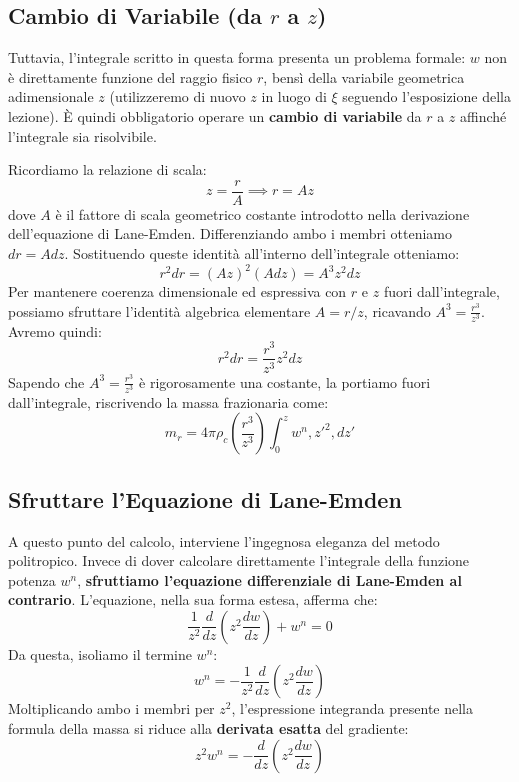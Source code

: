\subsection{Cambio di Variabile (da $r$ a $z$)}

Tuttavia, l'integrale scritto in questa forma presenta un problema formale: $w$ non è direttamente funzione del raggio fisico $r$, bensì della variabile geometrica adimensionale $z$ (utilizzeremo di nuovo $z$ in luogo di $\xi$ seguendo l'esposizione della lezione).
È quindi obbligatorio operare un \textbf{cambio di variabile} da $r$ a $z$ affinché l'integrale sia risolvibile.

Ricordiamo la relazione di scala:
\begin{equation}
z = \frac{r}{A} \implies r = A z
\end{equation}
dove $A$ è il fattore di scala geometrico costante introdotto nella derivazione dell'equazione di Lane-Emden. Differenziando ambo i membri otteniamo $dr = A dz$.
Sostituendo queste identità all'interno dell'integrale otteniamo:
\begin{equation}
r^2 dr = (A z)^2 (A dz) = A^3 z^2 dz
\end{equation}
Per mantenere coerenza dimensionale ed espressiva con $r$ e $z$ fuori dall'integrale, possiamo sfruttare l'identità algebrica elementare $A = r/z$, ricavando $A^3 = \frac{r^3}{z^3}$. Avremo quindi:
\begin{equation}
r^2 dr = \frac{r^3}{z^3} z^2 dz
\end{equation}
Sapendo che $A^3 = \frac{r^3}{z^3}$ è rigorosamente una costante, la portiamo fuori dall'integrale, riscrivendo la massa frazionaria come:
\begin{equation}
m_r = 4\pi \rho_c \left( \frac{r^3}{z^3} \right) \int_0^z w^n , z'^2 , dz'
\end{equation}

\subsection{Sfruttare l'Equazione di Lane-Emden}

A questo punto del calcolo, interviene l'ingegnosa eleganza del metodo politropico. Invece di dover calcolare direttamente l'integrale della funzione potenza $w^n$, \textbf{sfruttiamo l'equazione differenziale di Lane-Emden al contrario}.
L'equazione, nella sua forma estesa, afferma che:
\begin{equation}
\frac{1}{z^2} \frac{d}{dz} \left( z^2 \frac{dw}{dz} \right) + w^n = 0
\end{equation}
Da questa, isoliamo il termine $w^n$:
\begin{equation}
w^n = - \frac{1}{z^2} \frac{d}{dz} \left( z^2 \frac{dw}{dz} \right)
\end{equation}
Moltiplicando ambo i membri per $z^2$, l'espressione integranda presente nella formula della massa si riduce alla \textbf{derivata esatta} del gradiente:
\begin{equation}
z^2 w^n = - \frac{d}{dz} \left( z^2 \frac{dw}{dz} \right)
\end{equation}

